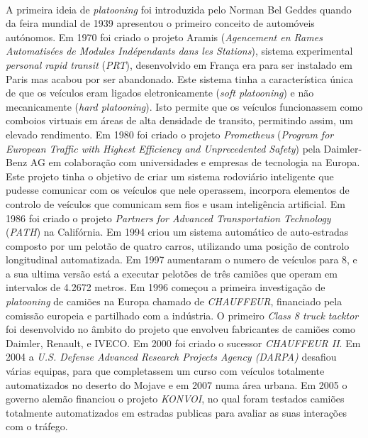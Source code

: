 \paragraph{}
A primeira ideia de \textit{platooning} foi introduzida pelo Norman Bel Geddes quando da feira mundial de 1939  apresentou o primeiro conceito de automóveis autónomos.
Em 1970 foi criado o projeto Aramis (\textit{Agencement en Rames Automatisées de Modules Indépendants dans les Stations}), sistema experimental \textit{personal rapid transit} (\textit{PRT}), desenvolvido em França era para ser instalado em Paris mas acabou por ser abandonado.  Este sistema tinha a característica única de que os veículos eram ligados eletronicamente (\textit{soft platooning}) e não mecanicamente (\textit{hard platooning}). Isto permite que os veículos funcionassem como comboios virtuais em áreas de alta densidade de transito, permitindo assim, um elevado rendimento.
Em 1980 foi criado o projeto \textit{Prometheus} (\textit{Program for European Traffic with Highest Efficiency and Unprecedented Safety}) pela Daimler-Benz AG em colaboração com universidades e empresas  de tecnologia na Europa. Este projeto tinha o objetivo de criar um sistema rodoviário inteligente que pudesse comunicar com os veículos que nele operassem, incorpora elementos de controlo de veículos que comunicam sem fios e usam inteligência artificial.
Em 1986 foi criado o projeto \textit{Partners for Advanced Transportation Technology} (\textit{PATH}) na Califórnia. Em 1994 criou um sistema automático de auto-estradas composto por um pelotão de quatro carros, utilizando uma posição de controlo longitudinal automatizada. Em 1997 aumentaram o numero de veículos para 8, e a sua ultima versão está a executar pelotões de três camiões que operam em intervalos de 4.2672 metros.
Em 1996 começou a primeira investigação de \textit{platooning} de camiões na Europa chamado de \textit{CHAUFFEUR}, financiado pela comissão europeia e partilhado com a indústria. O primeiro \textit{Class 8 truck tacktor} foi desenvolvido no âmbito do projeto que envolveu fabricantes de camiões como Daimler, Renault, e IVECO. Em 2000 foi criado o sucessor \textit{CHAUFFEUR II}.
Em 2004 a \textit{U.S. Defense Advanced Research Projects Agency (DARPA)} desafiou várias equipas, para que completassem um curso com veículos totalmente automatizados no deserto do Mojave e em 2007 numa área urbana.
Em 2005 o governo alemão financiou o projeto \textit{KONVOI}, no qual foram testados camiões totalmente automatizados em estradas publicas para avaliar as suas interações com o tráfego.
